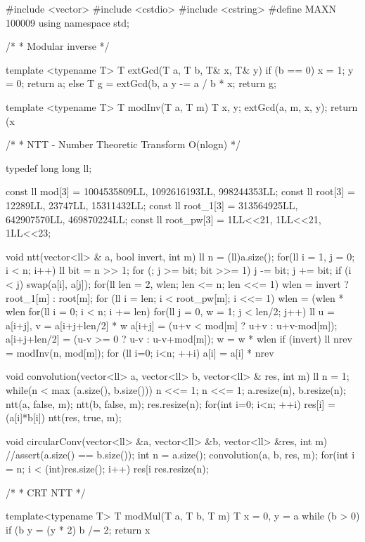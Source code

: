 \documentclass[11pt]{article}
\begin{document}
\begingroup\scriptsize
\begin{vncode}
#include <vector>
#include <cstdio>
#include <cstring>
#define MAXN 100009
using namespace std;

/*
 * Modular inverse
 */

template <typename T>
T extGcd(T a, T b, T& x, T& y) {
    if (b == 0) {
        x = 1; y = 0;
        return a;
    }
    else {
        T g = extGcd(b, a %
        y -= a / b * x;
        return g;
    }
}
 
template <typename T>
T modInv(T a, T m) {
    T x, y;
    extGcd(a, m, x, y);
    return (x %
}

/*
 * NTT - Number Theoretic Transform O(nlogn)
 */

typedef long long ll;

const ll mod[3] = {1004535809LL, 1092616193LL, 998244353LL};
const ll root[3] = {12289LL, 23747LL, 15311432LL};
const ll root_1[3] = {313564925LL, 642907570LL, 469870224LL};
const ll root_pw[3] = {1LL<<21, 1LL<<21, 1LL<<23};

void ntt(vector<ll> & a, bool invert, int m) {
	ll n = (ll)a.size();
	for(ll i = 1, j = 0; i < n; i++) {
		ll bit = n >> 1;
		for (; j >= bit; bit >>= 1) j -= bit;
		j += bit;
		if (i < j) swap(a[i], a[j]);
	}
	for(ll len = 2, wlen; len <= n; len <<= 1) {
		wlen = invert ? root_1[m] : root[m];
		for (ll i = len; i < root_pw[m]; i <<= 1)
			wlen = (wlen * wlen %
		for(ll i = 0; i < n; i += len) {
			for(ll j = 0, w = 1; j < len/2; j++) {
				ll u = a[i+j],  v = a[i+j+len/2] * w %
				a[i+j] = (u+v < mod[m] ? u+v : u+v-mod[m]);
				a[i+j+len/2] = (u-v >= 0 ? u-v : u-v+mod[m]);
				w = w * wlen %
			}
		}
	}
	if (invert) {
		ll nrev = modInv(n, mod[m]);
		for (ll i=0; i<n; ++i)
			a[i] = a[i] * nrev %
	}
}

void convolution(vector<ll> a, vector<ll> b, vector<ll> & res, int m) {
	ll n = 1;
	while(n < max (a.size(), b.size())) n <<= 1;
	n <<= 1;
	a.resize(n), b.resize(n);
	ntt(a, false, m); ntt(b, false, m);
	res.resize(n);
	for(int i=0; i<n; ++i) res[i] = (a[i]*b[i])%
	ntt(res, true, m);
}

void circularConv(vector<ll> &a, vector<ll> &b, vector<ll> &res, int m) {
	//assert(a.size() == b.size());
	int n = a.size();
	convolution(a, b, res, m);
	for(int i = n; i < (int)res.size(); i++)
		res[i%
	res.resize(n);
}

/*
 * CRT NTT
 */

template<typename T>
T modMul(T a, T b, T m) {
	T x = 0, y = a %
	while (b > 0) {
		if (b %
		y = (y * 2) %
		b /= 2;
	}
	return x %
}


\end{vncode}
\end{document}

